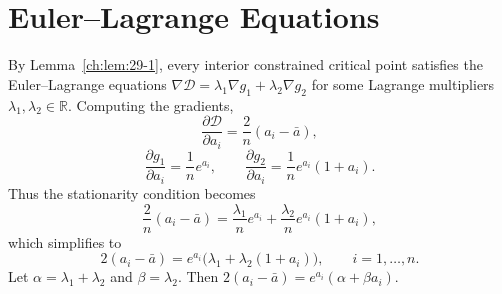 \section{Euler--Lagrange Equations}
By Lemma~\ref{ch:lem:29-1}, every interior constrained critical point satisfies the Euler--Lagrange equations
$\nabla\mathcal D = \lambda_1\nabla g_1 + \lambda_2\nabla g_2$
for some Lagrange multipliers \(\lambda_1,\lambda_2\in\mathbb R\).
Computing the gradients,
\[
\frac{\partial\mathcal D}{\partial a_i}
=
\frac{2}{n}(a_i-\bar a),
\]
\[
\frac{\partial g_1}{\partial a_i}
=
\frac{1}{n}e^{a_i},
\qquad
\frac{\partial g_2}{\partial a_i}
=
\frac{1}{n}e^{a_i}(1+a_i).
\]
Thus the stationarity condition becomes
\[
\frac{2}{n}(a_i-\bar a)
=
\frac{\lambda_1}{n}e^{a_i}
+
\frac{\lambda_2}{n}e^{a_i}(1+a_i),
\]
which simplifies to
\[
2(a_i-\bar a) = e^{a_i}\bigl(\lambda_1 + \lambda_2(1+a_i)\bigr),\qquad i=1,\ldots,n.
\]
Let \(\alpha = \lambda_1+\lambda_2\) and \(\beta = \lambda_2\). Then
$2(a_i-\bar a) = e^{a_i}(\alpha + \beta a_i).$
